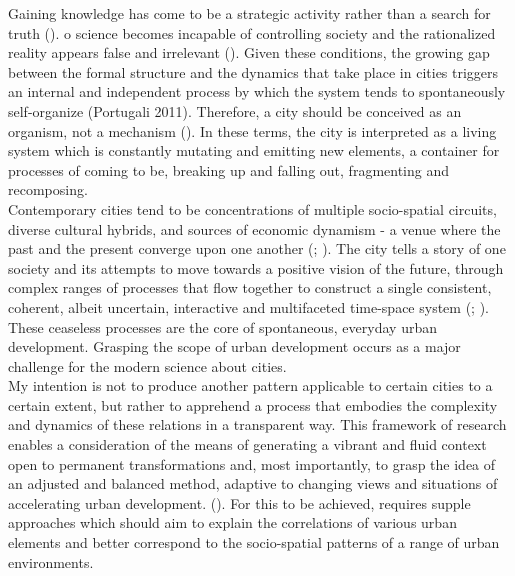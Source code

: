\documentclass[11pt]{report}
\begin{document}
{Gaining knowledge has come to be a strategic activity rather than a search for truth (\href{ref}{\citealt{kirby_cities_2013}}). 
o science becomes incapable of controlling society and the rationalized reality appears false and irrelevant (\href{ref}{\citealt{alfasi_planning_2004}}). Given these conditions, the growing gap between the formal structure and the dynamics that take place in cities triggers an internal and independent process by which the system tends to spontaneously self-organize (Portugali 2011). Therefore, a city should be conceived as an organism, not a mechanism (\href{ref}{\citealt{landry_creative_2012}}). In these terms, the city is interpreted as a living system which is constantly mutating and emitting new elements, a container for processes of coming to be, breaking up and falling out, fragmenting and recomposing.
\\

Contemporary cities tend to be concentrations of multiple socio-spatial circuits, diverse cultural hybrids, and sources of economic dynamism - a venue where the past and the present converge upon one another (\href{ref}{\citealt{braudel_history_1970}}; \href{ref}{\citealt{harvey_condition_2003}}). The city tells a story of one society and its attempts to move towards a positive vision of the future, through complex ranges of processes that flow together to construct a single consistent, coherent, albeit uncertain, interactive and multifaceted time-space system (\href{ref}{\citealt{graham_end_1998}}; \href{ref}{\citealt{graham_relational_1999}}). These ceaseless processes are the core of spontaneous, everyday urban development. Grasping the scope of urban development occurs as a major challenge for the modern science about cities.
\\

My intention is not to produce another pattern applicable to certain cities to a certain extent, but rather to apprehend a process that embodies the complexity and dynamics of these relations in a transparent way. This framework of research enables a consideration of the means of generating a vibrant and fluid context open to permanent transformations and, most importantly, to grasp the idea of an adjusted and balanced method, adaptive to changing views and situations of accelerating urban development. (\href{ref}{\citealt{portugali_complexity_2011}}). For this to be achieved, requires supple approaches which should aim to explain the correlations of various urban elements and  better correspond to the socio-spatial patterns of a range of urban environments. 
\\

}
\end{document}
